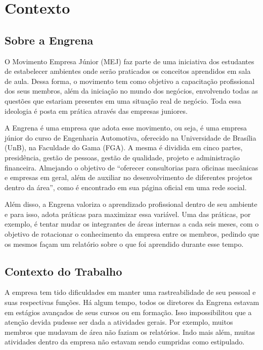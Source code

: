 \chapter{Contexto}
\label{context}

\section{Sobre a Engrena}

O Movimento Empresa Júnior (MEJ) faz parte de uma iniciativa dos estudantes de estabelecer ambientes onde serão praticados os conceitos aprendidos em sala de aula. Dessa forma, o movimento tem como objetivo a capacitação profissional dos seus membros, além da iniciação no mundo dos negócios, envolvendo todas as questões que estariam presentes em uma situação real de negócio. Toda essa ideologia é posta em prática através das empresas juniores.

A Engrena é uma empresa que adota esse movimento, ou seja, é uma empresa júnior do curso de Engenharia Automotiva, oferecido na Universidade de Brasília (UnB), na Faculdade do Gama (FGA). A mesma é dividida em cinco partes, presidência, gestão de pessoas, gestão de qualidade, projeto e administração financeira. Almejando o objetivo de “oferecer consultorias para oficinas mecânicas e empresas em geral, além de auxiliar no desenvolvimento de diferentes projetos dentro da área”, como é encontrado em sua página oficial em uma rede social.

Além disso, a Engrena valoriza o aprendizado profissional dentro de seu ambiente e para isso, adota práticas para maximizar essa variável. Uma das práticas, por exemplo, é tentar mudar os integrantes de áreas internas a cada seis meses, com o objetivo de rotacionar o conhecimento da empresa entre os membros, pedindo que os mesmos façam um relatório sobre o que foi aprendido durante esse tempo. 

\section{Contexto do Trabalho}

A empresa tem tido dificuldades em manter uma rastreabilidade de seu pessoal e suas respectivas funções. Há algum tempo, todos os diretores da Engrena estavam em estágios avançados de seus cursos ou em formação. Isso impossibilitou que a atenção devida pudesse ser dada a atividades gerais. Por exemplo, muitos membros que mudavam de área não faziam os relatórios. Indo mais além, muitas atividades dentro da empresa não estavam sendo cumpridas como estipulado.

